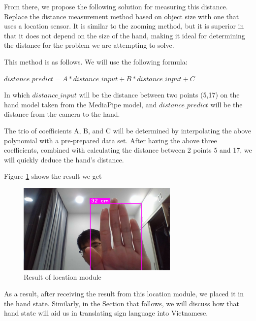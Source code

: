From there, we propose the following solution for measuring this distance. Replace the distance measurement method based on object size with one that uses a location sensor. It is similar to the zooming method, but it is superior in that it does not depend on the size of the hand, making it ideal for determining the distance for the problem we are attempting to solve.

This method is as follows. We will use the following formula:
\begin{center}
  $ distance\_predict = A*distance\_input + B*distance\_input + C $ 
\end{center}

In which $distance\_input$ will be the distance between two points (5,17) on the hand model taken from the MediaPipe model, and $distance\_predict$ will be the distance from the camera to the hand.

The trio of coefficients A, B, and C will be determined by interpolating the above polynomial with a pre-prepared data set. After having the above three coefficients, combined with calculating the distance between 2 points 5 and 17, we will quickly deduce the hand's distance. 

Figure \ref{fig:Chap4-LocationModule} shows the result we get

\begin{figure}[H]
	\centering
	\includegraphics[width=0.7\textwidth]{img/Chap4/Location_00.jpg}
	\caption{Result of location module}
	\label{fig:Chap4-LocationModule}
\end{figure}

As a result, after receiving the result from this location module, we placed it in the hand state. Similarly, in the Section that follows, we will discuss how that hand state will aid us in translating sign language into Vietnamese.

  
